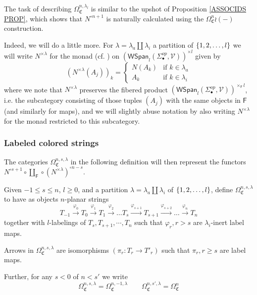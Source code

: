\documentclass[a4paper,10pt
,draft
]{article}%
\renewcommand{\1}{\eta}%
\begin{document}
The task of describing 
$\Omega^{n,\lambda_l}_{\mathfrak{C}}$
is similar to the upshot of Proposition \ref{ASSOCIDS PROP}, which shows that
$N^{\circ n+1}$ is naturally calculated using the
$\Omega_{\mathfrak{C}}^{n} \wr (-)$ 
construction.

Indeed, we will do a little more. For $\lambda = \lambda_a \amalg \lambda_i$
a partition of $\left\{1,2,\dots,l\right\}$
we will write 
$N^{\times \lambda}$
for the monad (cf. \cite[\S 2.3]{BP_geo}) on 
$\left(\mathsf{WSpan}_l(\Sigma_{\bullet}^{op},\mathcal{V})\right)^{\times l}$
given by
\[
\left(N^{\times \lambda} (A_j)\right)_k = 
\begin{cases}
N(A_k) & \text{if } k\in \lambda_a
\\
A_k & \text{if } k\in \lambda_i
\end{cases}
\]
where we note that $N^{\times \lambda}$
preserves the fibered product
$\left(\mathsf{WSpan}_l(\Sigma_{\bullet}^{op},\mathcal{V})\right)^{\times_{\mathsf{F}} l}$,
i.e. the subcategory consisting of those tuples $(A_j)$ with the same objects in $\mathsf{F}$ (and similarly for maps), and we will slightly abuse notation by also writing 
$N^{\times \lambda}$
for the monad restricted to this subcategory.


\subsubsection{Labeled colored strings}

The categories $\Omega_{\mathfrak C}^{n,s,\lambda}$ in the following definition will then represent
the functors
$N^{\circ s+1} \circ \coprod_{\mathsf{F}} \circ \left(N^{\times \lambda}\right)^{\circ n-s}$.

 

\begin{definition}\label{CLPS DEF}
      Given $-1 \leq s \leq n$, $l \geq 0$, and a partition $\lambda = \lambda_a \amalg \lambda_i$ of $\left\{1,2,\dots,l\right\}$,
      define $\Omega_{\mathfrak C}^{n,s,\lambda}$ to have as objects
$n$-planar strings
\begin{equation}
	T_{-1} \xrightarrow{\varphi_0} T_0 \xrightarrow{\varphi_1} T_1 \xrightarrow{\varphi_2} \dots
	T_{s} \xrightarrow{\varphi_{s+1}} T_{s+1} \xrightarrow{\varphi_{s+2}}  \dots
	\xrightarrow{\varphi_n} T_n
\end{equation}
together with $l$-labelings of $T_s, T_{s+1}, \cdots, T_n$
such that
$\varphi_{r}, r>s$ are $\lambda_i$-inert label maps.

Arrows in $\Omega_{\mathfrak C}^{n,s,\lambda}$
are isomorphisms $\left(\pi_r \colon T_r \to T'_r\right)$
such that $\pi_r,r \geq s$ are label maps.

Further, for any $s<0$ of $n<s'$ we write
\[
\Omega_{\mathfrak{C}}^{n,s,\lambda} = \Omega_{\mathfrak{C}}^{n,-1,\lambda}
\qquad
\Omega_{\mathfrak{C}}^{n,s',\lambda} = \Omega_{\mathfrak{C}}^{n}
\]
\end{definition}
\end{document}
